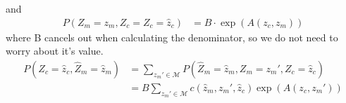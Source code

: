 \documentclass[12pt]{article}
\begin{document}
and
\begin{align*}
P(Z_m = z_m, Z_c = Z_c = \hat{z}_c) &=  B\cdot \exp(A(z_c, z_m))
\end{align*}
where B cancels out when calculating the denominator, so we do not need to worry about it's value.
\begin{align*}
P(Z_c = \hat{z}_c, \hat{Z}_m = \hat{z}_m) &= \sum_{z_m' \in \mathcal{M}}P(\hat{Z}_m = \hat{z}_m, Z_m = z_m', Z_c = \hat{z}_c) \\
&= B\sum_{z_m'\in\mathcal{M}}c(\hat{z}_m, z_m', \hat{z}_c)\exp(A(z_c, z_m'))
\end{align*}
\end{document}

